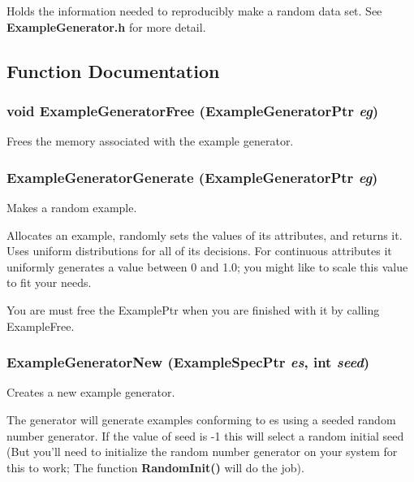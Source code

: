 Holds the information needed to reproducibly make a random data set. See {\bf Example\-Generator.h} for more detail. 



\subsection{Function Documentation}
\subsubsection{\setlength{\rightskip}{0pt plus 5cm}void Example\-Generator\-Free ({\bf Example\-Generator\-Ptr} {\em eg})}\label{ExampleGenerator_8h_a3}


Frees the memory associated with the example generator. 

\subsubsection{ Example\-Generator\-Generate ({\bf Example\-Generator\-Ptr} {\em eg})}\label{ExampleGenerator_8h_a4}


Makes a random example. 

Allocates an example, randomly sets the values of its attributes, and returns it. Uses uniform distributions for all of its decisions. For continuous attributes it uniformly generates a value between 0 and 1.0; you might like to scale this value to fit your needs.

You are must free the Example\-Ptr when you are finished with it by calling Example\-Free. 
\subsubsection{ Example\-Generator\-New ({\bf Example\-Spec\-Ptr} {\em es}, int {\em seed})}\label{ExampleGenerator_8h_a2}


Creates a new example generator. 

The generator will generate examples conforming to es using a seeded random number generator. If the value of seed is -1 this will select a random initial seed (But you'll need to initialize the random number generator on your system for this to work; The function {\bf Random\-Init()} will do the job). 